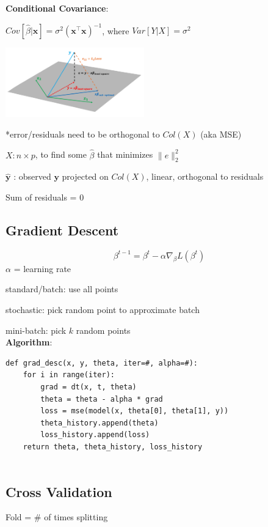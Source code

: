 \documentclass[8pt]{extarticle}
\begin{document}
\textbf{Conditional Covariance}: \par
$Cov[\hat{\beta} | \mathbf{x}] = \sigma^2(\mathbf{x}^\top \mathbf{x})^{-1}$, where $Var[Y|X]=\sigma^2$ \par

\begin{center} \includegraphics[width=0.45\textwidth]{leastsquares}\par \end{center}

*error/residuals need to be orthogonal to $Col(X)$ (aka MSE)\par
$X: n \times p$, to find some $\hat{\beta}$ that minimizes $\|e\|^2_2 $ \par
$\hat{\mathbf{y}}$ : observed $\mathbf{y}$ projected on $Col(X)$, linear, orthogonal to residuals \par
Sum of residuals = 0 \\
\hline

\subsection*{Gradient Descent}
$$\beta ^{t-1} = \beta^t-\alpha \nabla_\beta L(\beta^t)$$
$\alpha$ = learning rate\par
standard/batch: use all points \par
stochastic: pick random point to approximate batch \par
mini-batch: pick $k$ random points \\

\textbf{Algorithm}:
\begin{verbatim}
def grad_desc(x, y, theta, iter=#, alpha=#):
    for i in range(iter):
        grad = dt(x, t, theta)
        theta = theta - alpha * grad
        loss = mse(model(x, theta[0], theta[1], y))
        theta_history.append(theta)
        loss_history.append(loss)
    return theta, theta_history, loss_history
        
\end{verbatim}
\hline

\subsection*{Cross Validation}
Fold = \# of times splitting 
\end{document}
